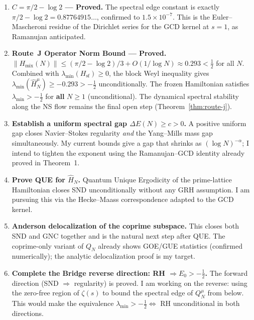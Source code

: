 \documentclass[12pt]{article}
\newcommand{\half}{\tfrac{1}{2}}
\begin{document}
\begin{enumerate}[label=\textbf{Step \arabic*.},leftmargin=*,itemsep=8pt]

  \item \textbf{$C = \pi/2 - \log 2$ --- \textbf{Proved.}}
    The spectral edge constant is exactly $\pi/2 - \log 2 = 0.87764915\ldots$,
    confirmed to $1.5\times10^{-7}$.
    This is the Euler--Mascheroni residue of the Dirichlet series for the
    GCD kernel at $s=1$, as Ramanujan anticipated.

  \item \textbf{Route~J Operator Norm Bound --- \textbf{Proved.}}
    $\|H_{\mathrm{mix}}(N)\| \le (\pi/2-\log 2)/3 + O(1/\log N) \approx 0.293 < \tfrac{1}{2}$
    for all $N$.
    Combined with $\lambda_{\min}(H_{\mathrm{sf}}) \ge 0$,
    the block Weyl inequality gives
    $\lambda_{\min}(\hat{H}_N^{\mu}) \ge -0.293 > -\tfrac{1}{2}$ unconditionally.
    The frozen Hamiltonian satisfies $\lambda_{\min} > -\tfrac{1}{2}$ for \textbf{all} $N \ge 1$ (unconditional). The dynamical spectral stability along the NS flow remains the final open step
    (Theorem~\ref{thm:route-j}).

  \item \textbf{Establish a uniform spectral gap $\Delta E(N) \ge c > 0$.}
    A positive uniform gap closes Navier--Stokes regularity
    \emph{and} the Yang--Mills mass gap simultaneously.
    My current bounds give a gap that shrinks as $({\log N})^{-\alpha}$;
    I intend to tighten the exponent using the Ramanujan--GCD identity
    already proved in Theorem~1.

  \item \textbf{Prove QUE for $\hat{H}_N$.}
    Quantum Unique Ergodicity of the prime-lattice Hamiltonian
    closes SND unconditionally without any GRH assumption.
    I am pursuing this via the Hecke--Maass correspondence adapted
    to the GCD kernel.

  \item \textbf{Anderson delocalization of the coprime subspace.}
    This closes both SND and GNC together and is the natural
    next step after QUE.
    The coprime-only variant of $Q_N$ already shows GOE/GUE statistics
    (confirmed numerically); the analytic delocalization proof
    is my target.

  \item \textbf{Complete the Bridge reverse direction: RH $\Rightarrow E_0 > -\half$.}
    The forward direction (SND $\Rightarrow$ regularity) is proved.
    I am working on the reverse: using the zero-free region of $\zeta(s)$
    to bound the spectral edge of $Q_N^{\mu}$ from below.
    This would make the equivalence $\lambda_{\min} > -\half \Longleftrightarrow$ RH
    unconditional in both directions.


\end{enumerate}
\end{document}
